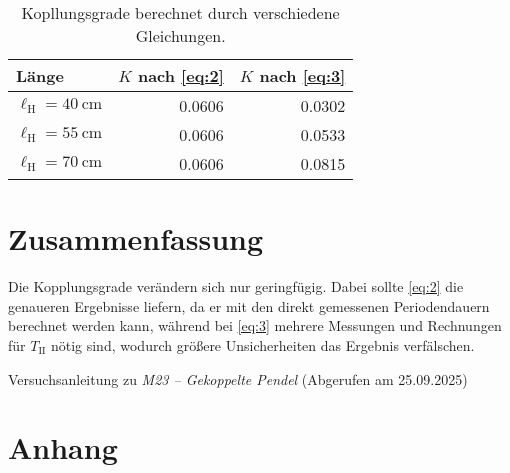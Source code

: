 \documentclass[
12pt,
a4paper,
bibliography=totocnumbered, %
BCOR=1cm, %
oneside, %
]{scrartcl}
\newcommand{\lh}{\ell_{\mathrm{H}}}
\begin{document}
\begin{table}[H]
	\begin{tabular*}{\textwidth}{@{\extracolsep{\fill}}@{\hspace{5pt}}lrr@{\hspace{5pt}}}
		\toprule
		Länge & \(K\) nach \autoref{eq:2} & \(K\) nach \autoref{eq:3}\\
		\midrule
		\(\lh = \qty{40}{\centi\meter}\) & \num{0,0606} & \num{0,0302}\\
		\(\lh = \qty{55}{\centi\meter}\) & \num{0,0606} & \num{0,0533}\\
		\(\lh = \qty{70}{\centi\meter}\) & \num{0,0606} & \num{0,0815}\\
		\bottomrule
	\end{tabular*}
	\caption{Kopllungsgrade berechnet durch verschiedene Gleichungen. \label{tbl:kopplungsgrade}}
\end{table}



\section{Zusammenfassung}
Die Kopplungsgrade verändern sich nur geringfügig. Dabei sollte \autoref{eq:2} die genaueren Ergebnisse liefern, da er mit den direkt gemessenen Periodendauern berechnet werden kann, während bei \autoref{eq:3} mehrere Messungen und Rechnungen für $T_{\text{II}}$ nötig sind, wodurch größere Unsicherheiten das Ergebnis verfälschen.

\begin{thebibliography}{999}
	 Versuchsanleitung zu \emph{M23 -- Gekoppelte Pendel} (Abgerufen am 25.09.2025)
\end{thebibliography}


\section{Anhang}


\end{document}
